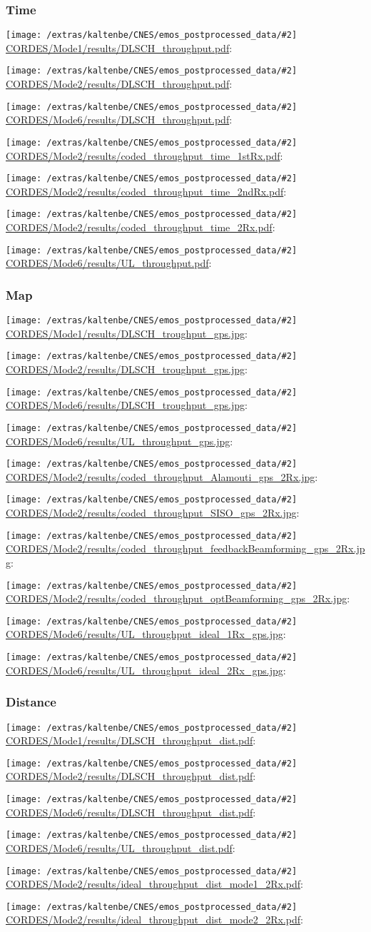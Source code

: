 \documentclass[a4paper,10pt]{article}
\newcommand{\printfile}[2][]{
 \begin{minipage}{8cm}
  \centering
  \texttt{[image: /extras/kaltenbe/CNES/emos\_postprocessed\_data/\#2]}
  \url{#2}: #1

 \end{minipage}
}
\begin{document}
\subsubsection{Time}

\printfile{CORDES/Mode1/results/DLSCH_throughput.pdf}
\printfile{CORDES/Mode2/results/DLSCH_throughput.pdf}

\printfile{CORDES/Mode6/results/DLSCH_throughput.pdf}
\printfile{CORDES/Mode2/results/coded_throughput_time_1stRx.pdf}

\printfile{CORDES/Mode2/results/coded_throughput_time_2ndRx.pdf}
\printfile{CORDES/Mode2/results/coded_throughput_time_2Rx.pdf}

\printfile{CORDES/Mode6/results/UL_throughput.pdf}


\subsubsection{Map}

\printfile{CORDES/Mode1/results/DLSCH_troughput_gps.jpg}
\printfile{CORDES/Mode2/results/DLSCH_troughput_gps.jpg}

\printfile{CORDES/Mode6/results/DLSCH_troughput_gps.jpg}
\printfile{CORDES/Mode6/results/UL_throughput_gps.jpg}

\printfile{CORDES/Mode2/results/coded_throughput_Alamouti_gps_2Rx.jpg}
\printfile{CORDES/Mode2/results/coded_throughput_SISO_gps_2Rx.jpg}

\printfile{CORDES/Mode2/results/coded_throughput_feedbackBeamforming_gps_2Rx.jpg}
\printfile{CORDES/Mode2/results/coded_throughput_optBeamforming_gps_2Rx.jpg}

\printfile{CORDES/Mode6/results/UL_throughput_ideal_1Rx_gps.jpg}
\printfile{CORDES/Mode6/results/UL_throughput_ideal_2Rx_gps.jpg}

\subsubsection{Distance}

\printfile{CORDES/Mode1/results/DLSCH_throughput_dist.pdf}
\printfile{CORDES/Mode2/results/DLSCH_throughput_dist.pdf}

\printfile{CORDES/Mode6/results/DLSCH_throughput_dist.pdf}
\printfile{CORDES/Mode6/results/UL_throughput_dist.pdf}


\printfile{CORDES/Mode2/results/ideal_throughput_dist_mode1_2Rx.pdf}
%
\printfile{CORDES/Mode2/results/ideal_throughput_dist_mode2_2Rx.pdf}
\end{document}
